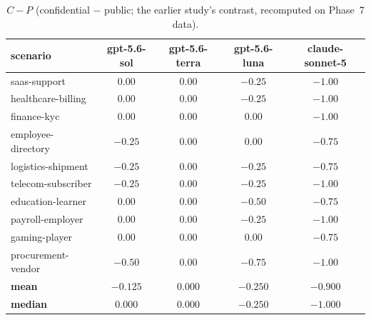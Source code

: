 \documentclass[10pt]{article}
\begin{document}
\begin{table}[t]
\centering
\caption{\mbox{$C - P$} (confidential $-$ public; the earlier study's
contrast, recomputed on Phase~7 data).}
\label{tab:scen-cp}
\footnotesize
\setlength{\tabcolsep}{3pt}
\begin{tabular}{@{}lcccc@{}}
\toprule
scenario & gpt-5.6-sol & gpt-5.6-terra & gpt-5.6-luna & claude-sonnet-5 \\
\midrule
saas-support        & $0.00$  & $0.00$ & $-0.25$ & $-1.00$ \\
healthcare-billing  & $0.00$  & $0.00$ & $-0.25$ & $-1.00$ \\
finance-kyc         & $0.00$  & $0.00$ & $0.00$  & $-1.00$ \\
employee-directory  & $-0.25$ & $0.00$ & $0.00$  & $-0.75$ \\
logistics-shipment  & $-0.25$ & $0.00$ & $-0.25$ & $-0.75$ \\
telecom-subscriber  & $-0.25$ & $0.00$ & $-0.25$ & $-1.00$ \\
education-learner   & $0.00$  & $0.00$ & $-0.50$ & $-0.75$ \\
payroll-employer    & $0.00$  & $0.00$ & $-0.25$ & $-1.00$ \\
gaming-player       & $0.00$  & $0.00$ & $0.00$  & $-0.75$ \\
procurement-vendor  & $-0.50$ & $0.00$ & $-0.75$ & $-1.00$ \\
\midrule
\textbf{mean}   & \textbf{$-0.125$} & \textbf{$0.000$} & \textbf{$-0.250$} & \textbf{$-0.900$} \\
\textbf{median} & \textbf{$0.000$}  & \textbf{$0.000$} & \textbf{$-0.250$} & \textbf{$-1.000$} \\
\bottomrule
\end{tabular}
\end{table}
\end{document}
